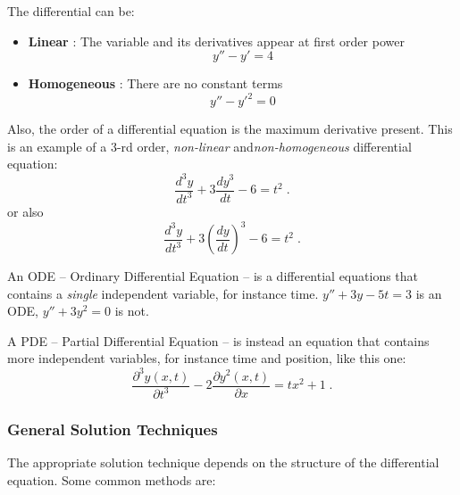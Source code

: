 \documentclass[12pt,a4paper]{article}
\begin{document}
The differential can be:
\begin{itemize}
	\item \textbf{Linear} : The variable and its derivatives appear at first order power $$y'' - y' = 4$$
	\item \textbf{Homogeneous} : There are no constant terms $$y'' - y'^2 = 0$$
\end{itemize}
Also, the order of a differential equation is the maximum derivative present. This is an example of a $3$-rd order, \textit{non-linear} and\textit{non-homogeneous} differential equation:
$$
\frac{d^3y}{dt^3} + 3\frac{dy^3}{dt} - 6 = t^2\;.
$$
or also
$$
\frac{d^3y}{dt^3} + 3\left(\frac{dy}{dt}\right)^3 - 6 = t^2\;.
$$

An ODE -- Ordinary Differential Equation -- is a differential equations that contains a \textit{single} independent variable, for instance time. $y'' + 3y - 5t = 3$ is an ODE, $y'' + 3y^2 = 0$ is not.

A PDE -- Partial Differential Equation -- is instead an equation that contains more independent variables, for instance time and position, like this one:
$$
\frac{\partial^3 y(x,t)}{\partial t^3} - 2\frac{\partial y^2(x,t)}{\partial x} = tx^2 + 1 \;.
$$

\subsubsection*{General Solution Techniques}

The appropriate solution technique depends on the structure of the differential equation. Some common methods are:
\end{document}
